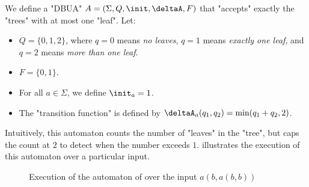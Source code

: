 \documentclass[a4paper,UKenglish,cleveref, autoref, thm-restate]{lipics-v2021}
\begin{document}
\begin{example}\label{ex:count-leaves}
	We define a "DBUA" $A = (\Sigma, Q, \init, \deltaA, F)$ that "accepts" exactly the "trees" with at most one "leaf". Let:
	\begin{itemize}
		\item $Q = \{0,1,2\}$, where $q=0$ means \textit{no leaves}, $q=1$ means \textit{exactly one leaf},
		      and $q=2$ means \textit{more than one leaf}.
		\item $F = \{0,1\}$.
		\item For all $a \in \Sigma$, we define $\init_a = 1$.
		\item The "transition function" is defined by $\deltaA_a(q_1, q_2) = \min(q_1 + q_2, 2)$.
	\end{itemize}

	Intuitively, this automaton counts the number of "leaves" in the "tree", but caps the count at $2$ to detect when the number exceeds $1$.
	 illustrates the execution of this automaton over a particular input.
\end{example}


\begin{figure}[h]
	\centering
	\caption{Execution of the automaton of  over the input $a(b,a(b,b))$}\label{fig:count-leaves}
\end{figure}
\end{document}
